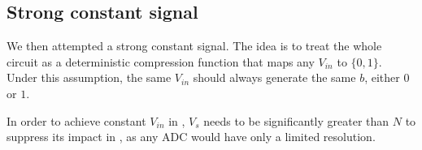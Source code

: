 %
%
%


\subsection{Strong constant signal} \label{Constant}
We then attempted a strong constant signal. The idea is to treat the whole circuit as a deterministic compression function that maps any $V_{in}$ to $\{0,1\}$. Under this assumption, the same $V_{in}$ should always generate the same $b$, either $0$ or $1$.

In order to achieve constant $V_{in}$ in , $V_s$ needs to be significantly greater than $N$ to suppress its impact in , as any ADC would have only a limited resolution.

